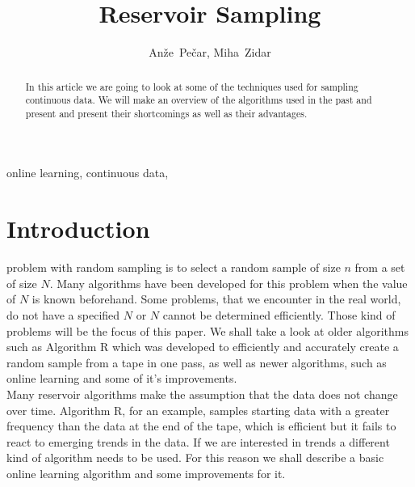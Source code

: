 \documentclass[journal]{IEEEtran/IEEEtran}
\begin{document}
\title{Reservoir Sampling}

\author{Anže~Pečar, Miha~Zidar}%


\maketitle

\begin{abstract}
In this article we are going to look at some of the techniques used for sampling continuous data. We will make an overview of the algorithms used in the past and present and present their shortcomings as well as their advantages. 
\end{abstract}

\begin{IEEEkeywords}
online learning, continuous data, 
\end{IEEEkeywords}

\IEEEpeerreviewmaketitle


\section{Introduction}
 problem with random sampling is to select a random sample of size $n$ from a set of size $N$. Many algorithms have been developed for this problem when the value of $N$ is known beforehand. Some problems, that we encounter in the real world, do not have a specified $N$ or $N$ cannot be determined efficiently. Those kind of problems will be the focus of this paper. We shall take a look at older algorithms such as Algorithm R which was developed to efficiently and accurately create a random sample from a tape in one pass, as well as newer algorithms, such as online learning and some of it's improvements.\\

Many reservoir algorithms make the assumption that the data does not change over time. Algorithm R, for an example, samples starting data with a greater frequency than the data at the end of the tape, which is efficient but it fails to react to emerging trends in the data. If we are interested in trends  a different kind of algorithm needs to be used. For this reason we shall describe a basic online learning algorithm and some improvements for it.\\\\
\end{document}
